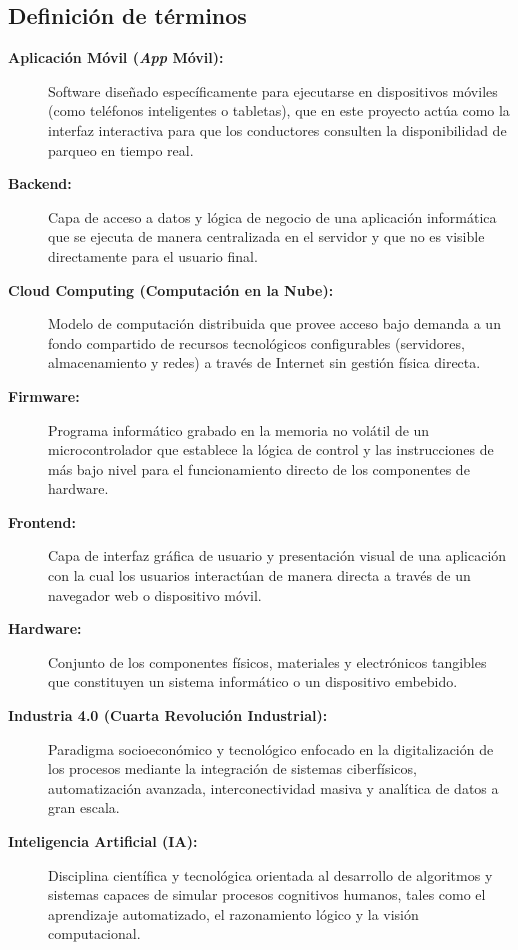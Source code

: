 \documentclass[12pt,a4paper]{article}
\begin{document}
\subsection{Definición de términos}

\begin{description}	
	\item[\textbf{Aplicación Móvil (\textit{App} Móvil):}] Software diseñado específicamente para ejecutarse en dispositivos móviles (como teléfonos inteligentes o tabletas), que en este proyecto actúa como la interfaz interactiva para que los conductores consulten la disponibilidad de parqueo en tiempo real.
	
	\item[\textbf{Backend:}] Capa de acceso a datos y lógica de negocio de una aplicación informática que se ejecuta de manera centralizada en el servidor y que no es visible directamente para el usuario final.
	
	\item[\textbf{Cloud Computing (Computación en la Nube):}] Modelo de computación distribuida que provee acceso bajo demanda a un fondo compartido de recursos tecnológicos configurables (servidores, almacenamiento y redes) a través de Internet sin gestión física directa.
	
	\item[\textbf{Firmware:}] Programa informático grabado en la memoria no volátil de un microcontrolador que establece la lógica de control y las instrucciones de más bajo nivel para el funcionamiento directo de los componentes de hardware.
	
	\item[\textbf{Frontend:}] Capa de interfaz gráfica de usuario y presentación visual de una aplicación con la cual los usuarios interactúan de manera directa a través de un navegador web o dispositivo móvil.
	
	\item[\textbf{Hardware:}] Conjunto de los componentes físicos, materiales y electrónicos tangibles que constituyen un sistema informático o un dispositivo embebido.
	
	\item[\textbf{Industria 4.0 (Cuarta Revolución Industrial):}] Paradigma socioeconómico y tecnológico enfocado en la digitalización de los procesos mediante la integración de sistemas ciberfísicos, automatización avanzada, interconectividad masiva y analítica de datos a gran escala.
	
	\item[\textbf{Inteligencia Artificial (IA):}] Disciplina científica y tecnológica orientada al desarrollo de algoritmos y sistemas capaces de simular procesos cognitivos humanos, tales como el aprendizaje automatizado, el razonamiento lógico y la visión computacional.
	

\end{description}
\end{document}
